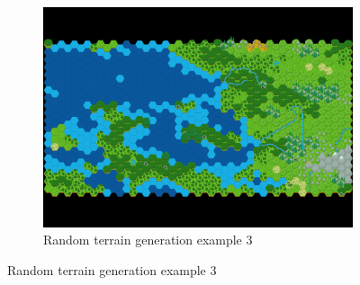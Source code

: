 \documentclass[english]{tudscrreprt}
\begin{document}
\begin{figure}[h]
\begin{subfigure}[b]{0.32\textwidth}
    \includegraphics[width=\textwidth]{figures/hexGrid3.png}
    \caption{Random terrain generation example 3}
    \label{fig:terrain_3}
\end{subfigure}

\vspace{0.5cm}


\end{figure}
\end{document}
